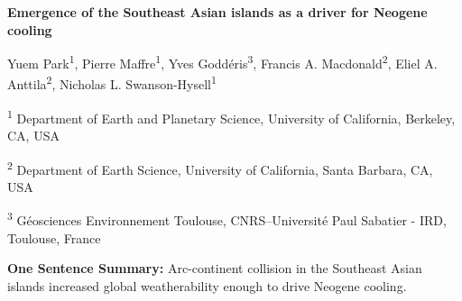 \documentclass[11pt,letterpaper]{article}
\newcommand{\pCOtwo}{\textit{p}CO$_{2}$\xspace}
\newcommand{\COtwo}{CO$_{2}$\xspace}
\begin{document}
\begin{flushleft}
{\Large \textbf{Emergence of the Southeast Asian islands as a driver for Neogene cooling}}

Yuem Park\textsuperscript{1},
Pierre Maffre\textsuperscript{1},
Yves Godd\'eris\textsuperscript{3},
Francis A. Macdonald\textsuperscript{2},
Eliel A. Anttila\textsuperscript{2},
Nicholas L. Swanson-Hysell\textsuperscript{1}

\bigskip
\textsuperscript{1} Department of Earth and Planetary Science, University of California, Berkeley, CA, USA

\textsuperscript{2} Department of Earth Science, University of California, Santa Barbara, CA, USA

\textsuperscript{3} G\'eosciences Environnement Toulouse, CNRS--Universit\'e Paul Sabatier - IRD, Toulouse, France

\bigskip

\end{flushleft}

\linenumbers

\noindent
\textbf{One Sentence Summary:} Arc-continent collision in the Southeast Asian islands increased global weatherability enough to drive Neogene cooling.

\begin{abstract}
The Southeast Asian islands bring together steep topography, a tropical climate, and mafic lithologies to efficiently weather rocks in the region and consume large amounts of \COtwo. Concurrent with global cooling since the mid-Miocene, ongoing arc-continent collision has led to a significant increase of subaerially-exposed land area in the region. Here we use geologic data to reconstruct the shorelines of the Southeast Asian islands over the past 15 million years and quantify the increase in land area. We use these paleoshorelines as boundary conditions within a coupled weathering-climate model to quantify the change in steady-state \pCOtwo associated with this emergence. We find that the modeled decrease in \pCOtwo due to these paleogeographic changes is sufficient to explain long-term climatic cooling over the Neogene.
\end{abstract}
\end{document}
